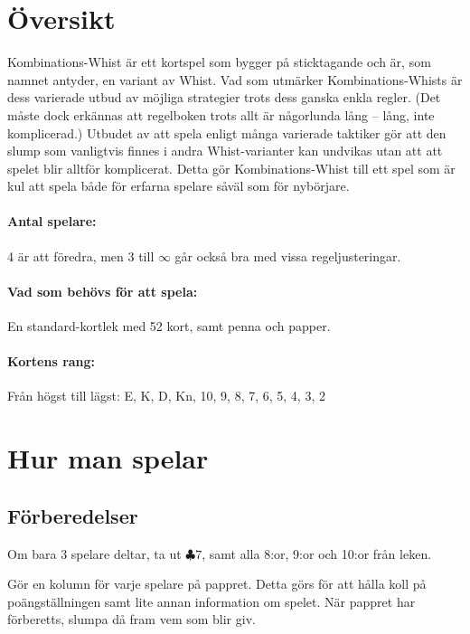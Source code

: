 \documentclass[a4paper]{article}
\author{Av Joakim Nilsson}
\date{Utvecklingsversion (baserad på version \varVersion-\varLanguage) -- \today}
\date{Version \varVersion-\varLanguage\ -- \today}
\begin{document}

	\introPages
	\pagebreak


	\section{Översikt}
		Kombinations-Whist är ett kortspel som bygger på sticktagande och är, som namnet antyder, en variant av Whist. Vad som utmärker Kombinations-Whists är dess varierade utbud av möjliga strategier trots dess ganska enkla regler. (Det måste dock erkännas att regelboken trots allt är någorlunda lång -- lång, inte komplicerad.) Utbudet av att spela enligt många varierade taktiker gör att den slump som vanligtvis finnes i andra Whist-varianter kan undvikas utan att att spelet blir alltför komplicerat. Detta gör Kombinations-Whist till ett spel som är kul att spela både för erfarna spelare såväl som för nybörjare.

		\paragraph{Antal spelare:}
		4 är att föredra, men 3 till $\infty$ går också bra med vissa regeljusteringar.

		\paragraph{Vad som behövs för att spela:}
		En standard-kortlek med 52 kort, samt penna och papper.

		\paragraph{Kortens rang:}
		Från högst till lägst: E, K, D, Kn, 10, 9, 8, 7, 6, 5, 4, 3, 2

	\section{Hur man spelar}
		\subsection{Förberedelser}
			Om bara 3 spelare deltar, ta ut $\clubsuit 7$, samt alla 8:or, 9:or och 10:or från leken.

			Gör en kolumn för varje spelare på pappret. Detta görs för att hålla koll på poängställningen samt lite annan information om spelet. När pappret har förberetts, slumpa då fram vem som blir giv.
\end{document}
